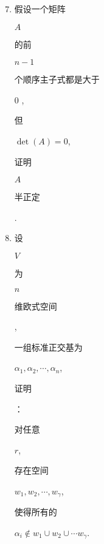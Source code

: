 \documentclass[10pt]{article}
\begin{document}
\begin{enumerate}
  \setcounter{enumi}{6}
  \item \begin{CJK}{UTF8}{mj}假设一个矩阵\end{CJK} $A$ \begin{CJK}{UTF8}{mj}的前\end{CJK} $n-1$ \begin{CJK}{UTF8}{mj}个顺序主子式都是大于\end{CJK} 0 , \begin{CJK}{UTF8}{mj}但\end{CJK} $\operatorname{det}(A)=0$, \begin{CJK}{UTF8}{mj}证明\end{CJK} $A$ \begin{CJK}{UTF8}{mj}半正定\end{CJK}.

  \item \begin{CJK}{UTF8}{mj}设\end{CJK} $V$ \begin{CJK}{UTF8}{mj}为\end{CJK} $n$ \begin{CJK}{UTF8}{mj}维欧式空间\end{CJK},\begin{CJK}{UTF8}{mj}一组标准正交基为\end{CJK} $\alpha_{1}, \alpha_{2}, \cdots, \alpha_{n}$, \begin{CJK}{UTF8}{mj}证明\end{CJK}：\begin{CJK}{UTF8}{mj}对任意\end{CJK} $r$, \begin{CJK}{UTF8}{mj}存在空间\end{CJK} $w_{1}, w_{2}, \cdots, w_{\gamma}$, \begin{CJK}{UTF8}{mj}使得所有的\end{CJK} $\alpha_{i} \notin w_{1} \cup w_{2} \cup \cdots w_{\gamma}$.


\end{enumerate}
\end{document}
